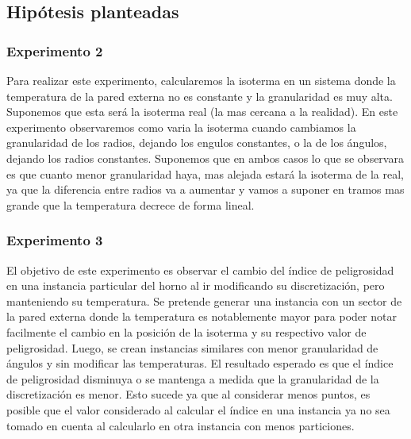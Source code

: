   \subsection{Hipótesis planteadas}

  	\subsubsection*{Experimento 2}
  	Para realizar este experimento, calcularemos la isoterma en un sistema donde la temperatura de la pared externa no es constante y la granularidad es muy alta. Suponemos que esta será la isoterma real (la mas cercana a la realidad). 
  	En este experimento observaremos como varia la isoterma cuando cambiamos la granularidad de los radios, dejando los engulos constantes, o la de los ángulos, dejando los radios constantes. 
  	Suponemos que en ambos casos lo que se observara es que cuanto menor granularidad haya, mas alejada estará la isoterma de la real, ya que la diferencia entre radios va a aumentar y vamos a suponer en tramos mas grande que la temperatura decrece de forma lineal.

  	\subsubsection*{Experimento 3}
  	El objetivo de este experimento es observar el cambio del índice de peligrosidad en una instancia particular del horno al ir modificando su discretización, pero manteniendo su temperatura. 
  	Se pretende generar una instancia con un sector de la pared externa donde la temperatura es notablemente mayor para poder notar facilmente el cambio en la posición de la isoterma y su respectivo valor de peligrosidad. Luego, se crean instancias similares con menor granularidad de ángulos y sin modificar las temperaturas. El resultado esperado es que el índice de peligrosidad disminuya o se mantenga a medida que la granularidad de la discretización es menor. Esto sucede ya que al considerar menos puntos, es posible que el valor considerado al calcular el índice en una instancia ya no sea tomado en cuenta al calcularlo en otra instancia con menos particiones.

